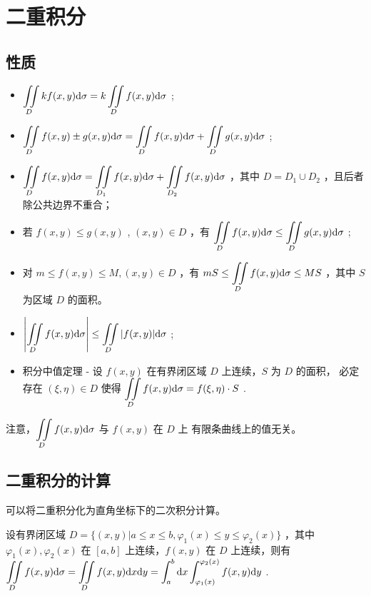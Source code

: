 \section{二重积分}

\subsection{性质}

\begin{itemize}
    \item $ \displaystyle \iint\limits_{D}kf(x,y)\mathrm{d}\sigma = k \iint\limits_{D}f(x,y)\mathrm{d}\sigma $ ;
    \item $ \displaystyle \iint\limits_{D}f(x,y)\pm g(x,y)\mathrm{d}\sigma 
     = \iint\limits_{D}f(x,y)\mathrm{d}\sigma + \iint\limits_{D}g(x,y)\mathrm{d}\sigma$ ;
    \item $ \displaystyle \iint\limits_{D}f(x,y)\mathrm{d}\sigma = \iint\limits_{D_1}f(x,y)\mathrm{d}\sigma
    + \iint\limits_{D_2}f(x,y)\mathrm{d}\sigma $ ，其中 $ D = D_1\cup D_2 $ ，且后者
    除公共边界不重合；
    \item 若 $ f(x,y)\leq g(x,y) $ , $ (x,y)\in D $ ，有 $ \displaystyle \iint\limits_{D}f(x,y)\mathrm{d}\sigma
    \leq \iint\limits_{D}g(x,y)\mathrm{d}\sigma $ ;
    \item 对 $ m\leq f(x,y)\leq M,(x,y)\in D $ ，有 $ \displaystyle mS \leq \iint\limits_{D}f(x,y)\mathrm{d}\sigma
    \leq MS $ ，其中 $ S $ 为区域 $ D $ 的面积。
    \item $ \displaystyle \left|\iint\limits_{D}f(x,y)\mathrm{d}\sigma\right| \leq \iint\limits_{D}|f(x,y)|\mathrm{d}\sigma $ ;
    \item 积分中值定理 - 设 $ f(x,y) $ 在有界闭区域 $ D $ 上连续，$ S $ 为 $ D $ 的面积，
    必定存在 $ (\xi,\eta)\in D $ 使得 $ \displaystyle \iint\limits_{D}f(x,y)\mathrm{d}\sigma = f(\xi,\eta)\cdot S $ .
\end{itemize}

注意，$ \displaystyle \iint\limits_{D}f(x,y)\mathrm{d}\sigma $ 与 $ f(x,y) $ 在 $ D $ 上
有限条曲线上的值无关。

\subsection{二重积分的计算}


可以将二重积分化为直角坐标下的二次积分计算。

设有界闭区域 $ D = \{(x,y)|a\leq x\leq b,\varphi_1(x)\leq y\leq \varphi_2(x)\} $ ，其中
$ \varphi_1(x),\varphi_2(x) $ 在 $ [a,b] $ 上连续，$ f(x,y) $ 在 $ D $ 上连续，则有
$ \displaystyle \iint\limits_{D}f(x,y)\mathrm{d}\sigma = \iint\limits_{D}f(x,y)\mathrm{d}x\mathrm{d}y
 = \int_a^b\mathrm{d}x\int_{\varphi_1(x)}^{\varphi_2(x)}f(x,y)\mathrm{d}y $ .

